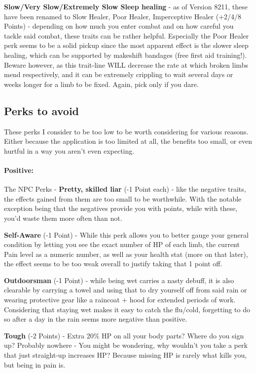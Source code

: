 \textbf{Slow/Very Slow/Extremely Slow Sleep healing} - as of Version 8211, these have been renamed to Slow Healer, Poor Healer, Imperceptive Healer (+2/4/8 Points) - depending on how much you enter combat and on how careful you tackle said combat, these traits can be rather helpful. Especially the Poor Healer perk seems to be a solid pickup since the most apparent effect is the slower sleep healing, which can be supported by makeshift bandages (free first aid training!). Beware however, as this trait-line WILL decrease the rate at which broken limbs mend respectively, and it can be extremely crippling to wait several days or weeks longer for a limb to be fixed. Again, pick only if you dare.

\subsection{Perks to avoid}
These perks I consider to be too low to be worth considering for various reasons. Either because the application is too limited at all, the benefits too small, or even hurtful in a way you aren't even expecting.

\paragraph{Positive:}

The NPC Perks - \textbf{Pretty, skilled liar} (-1 Point each) - like the negative traits, the effects gained from them are too small to be worthwhile. With the notable exception being that the negatives provide you with points, while with these, you'd waste them more often than not.

\textbf{Self-Aware} (-1 Point) - While this perk allows you to better gauge your general condition by letting you see the exact number of HP of each limb, the current Pain level as a numeric number, as well as your health stat (more on that later), the effect seems to be too weak overall to justify taking that 1 point off.

\textbf{Outdoorsman} (-1 Point) - while being wet carries a nasty debuff, it is also clearable by carrying a towel and using that to dry yourself off from said rain or wearing protective gear like a raincoat + hood for extended periods of work. Considering that staying wet makes it easy to catch the flu/cold, forgetting to do so after a day in the rain seems more negative than positive.

\textbf{Tough} (-2 Points) - Extra 20\% HP on all your body parts? Where do you sign up? Probably nowhere - You might be wondering, why wouldn't you take a perk that just straight-up increases HP? Because missing HP is rarely what kills you, but being in pain is.

